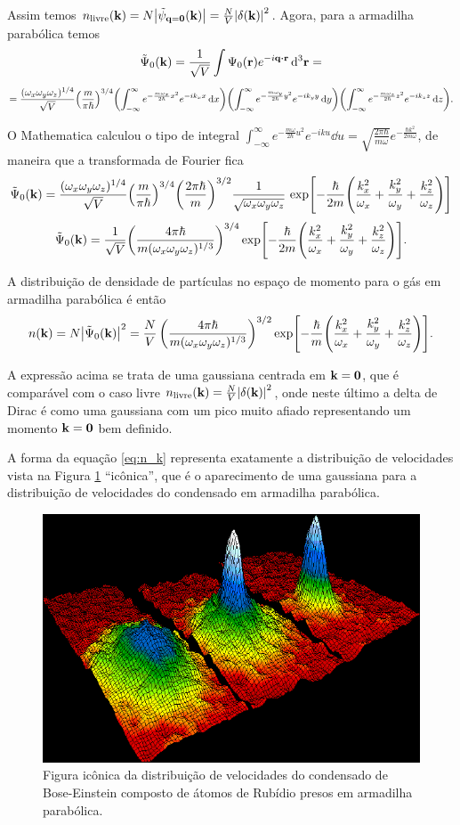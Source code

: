 \documentclass[a4paper,10pt]{article}
\begin{document}
Assim temos $n_{\text{livre}}(\vb{k}) = N \abs{\tilde{\psi}_{\vb{q}=\vb{0}}(\vb{k})} = \frac{N}{V} \abs{\delta(\vb{k})}^2$. Agora, para a armadilha parabólica temos
$$
\tilde{\Psi}_0(\k) = \frac{1}{\sqrt{V}} \int \Psi_0(\r) e^{-i\q\vdot\r} \dd[3]{\r} =
$$
$$
= \frac{(\omega_x \omega_y \omega_z)^{1/4}}{\sqrt{V}} \qty(\frac{m}{\pi\hbar})^{3/4}
\qty(\int_{-\infty}^{\infty} e^{-\frac{m\omega_x}{2\hbar} x^2} e^{-i k_x x} \dd{x})
\qty(\int_{-\infty}^{\infty} e^{-\frac{m\omega_y}{2\hbar} y^2} e^{-i k_y y} \dd{y})
\qty(\int_{-\infty}^{\infty} e^{-\frac{m\omega_z}{2\hbar} z^2} e^{-i k_z z} \dd{z}).
$$

O Mathematica calculou o tipo de integral $\int_{-\infty}^{\infty} e^{-\frac{m\omega}{2\hbar} u^2} e^{-i k u} \dd{u} = \sqrt{\frac{2\pi\hbar}{m\omega}} e^{-\frac{\hbar k^2}{2m\omega}}$, de maneira que a transformada de Fourier fica
$$
\tilde{\Psi}_0(\vb{k}) =
\frac{(\omega_x \omega_y \omega_z)^{1/4}}{\sqrt{V}} \qty(\frac{m}{\pi\hbar})^{3/4}
\qty(\frac{2\pi\hbar}{m})^{3/2} \frac{1}{\sqrt{\omega_x \omega_y \omega_z}} \,
\exp[-\frac{\hbar}{2m} \qty(\frac{k_x^2}{\omega_x} + \frac{k_y^2}{\omega_y} + \frac{k_z^2}{\omega_z})]
$$
$$
\tilde{\Psi}_0(\vb{k}) =
\frac{1}{\sqrt{V}} \qty(\frac{4 \pi \hbar}{m (\omega_x\omega_y\omega_z)^{1/3}})^{3/4}
\exp[-\frac{\hbar}{2m} \qty(\frac{k_x^2}{\omega_x} + \frac{k_y^2}{\omega_y} + \frac{k_z^2}{\omega_z})].
$$

A distribuição de densidade de partículas no espaço de momento para o gás em armadilha parabólica é então
\begin{equation} \label{eq:n_k}
n(\vb{k}) = N \abs{\tilde{\Psi}_0(\vb{k})}^2 =
\frac{N}{V} \, \qty(\frac{4 \pi \hbar}{m (\omega_x\omega_y\omega_z)^{1/3}})^{3/2}
\exp[-\frac{\hbar}{m} \qty(\frac{k_x^2}{\omega_x} + \frac{k_y^2}{\omega_y} + \frac{k_z^2}{\omega_z})].
\end{equation}

A expressão acima se trata de uma gaussiana centrada em $\vb{k}=\vb{0}$, que é comparável com o caso livre $n_{\text{livre}}(\vb{k}) = \frac{N}{V} \abs{\delta(\vb{k})}^2$, onde neste último a delta de Dirac é como uma gaussiana com um pico muito afiado representando um momento $\vb{k} = \vb{0}$ bem definido.

A forma da equação \ref{eq:n_k} representa exatamente a distribuição de velocidades vista na Figura \ref{fig:iconica} ``icônica'', que é o aparecimento de uma gaussiana para a distribuição de velocidades do condensado em armadilha parabólica.
\begin{figure}[H]
\centering
\includegraphics[width=0.6\linewidth]{fig/iconica.png}
\caption{Figura icônica da distribuição de velocidades do condensado de Bose-Einstein composto de átomos de Rubídio presos em armadilha parabólica.}
\label{fig:iconica}
\end{figure}
\end{document}

